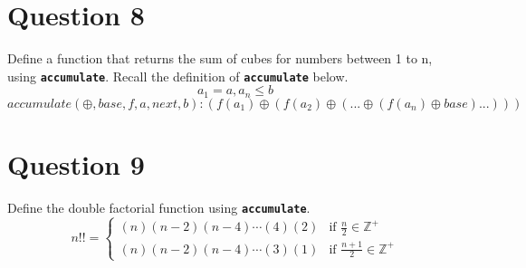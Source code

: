 \section{Question 8}
Define a function that returns the sum of cubes for numbers between 1 to n, using \texttt{\bfseries accumulate}.
Recall the definition of \texttt{\bfseries accumulate} below.
\[a_1 = a, a_n \le b\]
\[accumulate(\oplus, base, f, a, next, b): (f(a_1) \oplus (f(a_2) \oplus (... \oplus (f(a_n) \oplus base)...)))\]

\section{Question 9}
Define the double factorial function using \texttt{\bfseries accumulate}.
\[
    n!! =
    \begin{cases}
        (n)(n-2)(n-4)\cdots(4)(2) & \text{if } \frac{n}{2} \in \mathbb{Z^+} \\
        (n)(n-2)(n-4)\cdots(3)(1) & \text{if } \frac{n+1}{2} \in \mathbb{Z^+}
    \end{cases}    
\]
